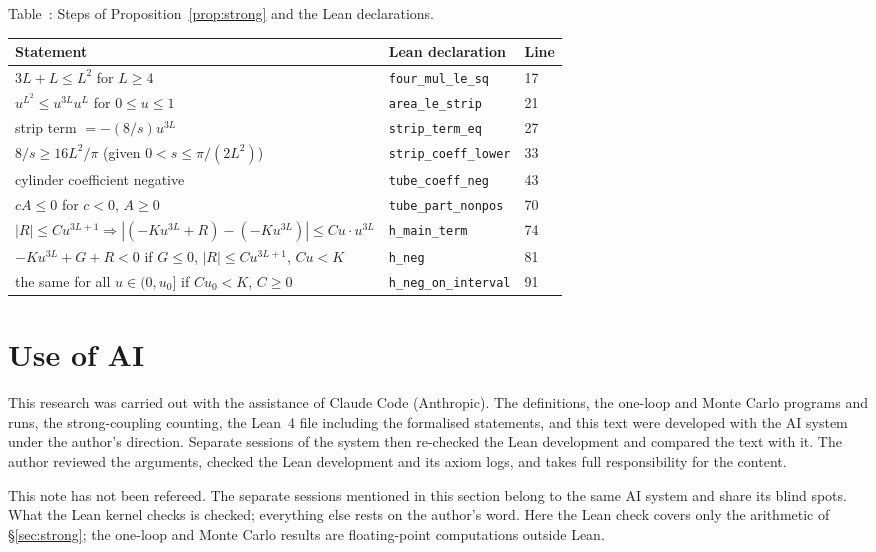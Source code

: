 \documentclass[11pt,a4paper]{article}
\theoremstyle{definition}
\theoremstyle{remark}
\begin{document}
\begin{center}\small
{}\label{tab:corr}Table~\thetable: Steps of Proposition~\ref{prop:strong} and the Lean declarations.\\[4pt]
\begin{tabular}{@{}lll@{}}\toprule
Statement & Lean declaration & Line\\\midrule
$3L+L\le L^2$ for $L\ge4$ & \texttt{four\_mul\_le\_sq} & 17\\
$u^{L^2}\le u^{3L}u^L$ for $0\le u\le1$ & \texttt{area\_le\_strip} & 21\\
strip term $=-(8/s)u^{3L}$ & \texttt{strip\_term\_eq} & 27\\
$8/s\ge16L^2/\pi$ (given $0<s\le\pi/(2L^2)$) & \texttt{strip\_coeff\_lower} & 33\\
cylinder coefficient negative & \texttt{tube\_coeff\_neg} & 43\\
$cA\le0$ for $c<0$, $A\ge0$ & \texttt{tube\_part\_nonpos} & 70\\
$|R|\le Cu^{3L+1}\Rightarrow|(-Ku^{3L}+R)-(-Ku^{3L})|\le Cu\cdot u^{3L}$ & \texttt{h\_main\_term} & 74\\
$-Ku^{3L}+G+R<0$ if $G\le0$, $|R|\le Cu^{3L+1}$, $Cu<K$ & \texttt{h\_neg} & 81\\
the same for all $u\in(0,u_0]$ if $Cu_0<K$, $C\ge0$ & \texttt{h\_neg\_on\_interval} & 91\\\bottomrule
\end{tabular}
\end{center}

\section{Use of AI}\label{sec:ai}

This research was carried out with the assistance of Claude Code (Anthropic). The definitions, the one-loop and Monte Carlo programs and runs, the strong-coupling counting, the Lean~4 file including the formalised statements, and this text were developed with the AI system under the author's direction. Separate sessions of the system then re-checked the Lean development and compared the text with it. The author reviewed the arguments, checked the Lean development and its axiom logs, and takes full responsibility for the content.

This note has not been refereed. The separate sessions mentioned in this section belong to the same AI system and share its blind spots. What the Lean kernel checks is checked; everything else rests on the author's word. Here the Lean check covers only the arithmetic of \S\ref{sec:strong}; the one-loop and Monte Carlo results are floating-point computations outside Lean.
\end{document}
